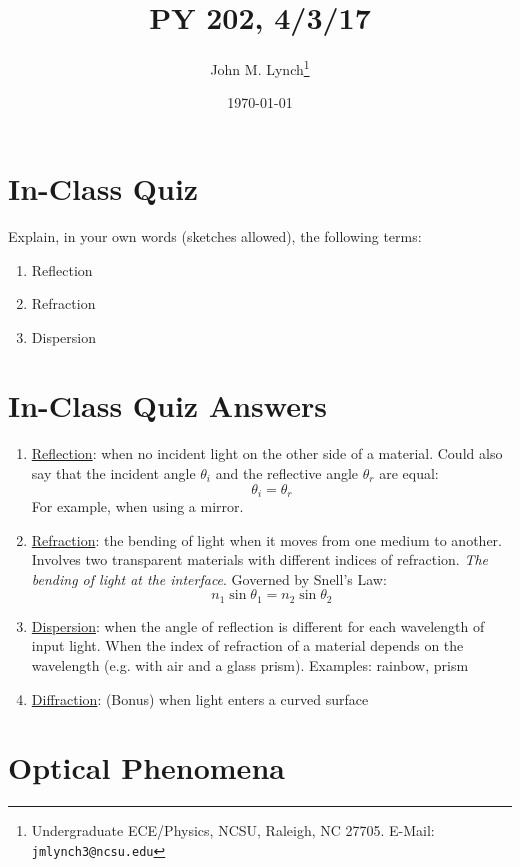 \documentclass[twocolumn,draft]{article}
\title{PY 202, 4/3/17}
\author{John M. Lynch\footnote{Undergraduate ECE/Physics, NCSU, Raleigh, NC 27705. E-Mail: \texttt{jmlynch3@ncsu.edu}}}
\date{\today}
\begin{document}
  \maketitle
\section*{In-Class Quiz}

Explain, in your own words (sketches allowed), the following terms:

\begin{enumerate}
	\item Reflection
	\item Refraction
	\item Dispersion
\end{enumerate}

\section*{In-Class Quiz Answers}

\begin{enumerate}
	\item \underline{Reflection}: when no incident light on the other side of a material. Could also
					  say that the incident angle $\theta_{i}$ and the reflective angle $\theta_{r}$
					  are equal:
					  \begin{equation}
					  	\theta_{i} = \theta_{r}
					  \end{equation}
					  For example, when using a mirror.
	\item \underline{Refraction}: the bending of light when it moves from one medium to another.
								  Involves two transparent materials with different indices
								  of refraction. \emph{The bending of light at the interface}.
								  Governed by Snell's Law:
								  \begin{equation}
								  	n_{1}\sin{\theta_{1}} = n_{2}\sin{\theta_{2}}
								  \end{equation}
	\item \underline{Dispersion}: when the angle of reflection is different for each wavelength
		 						  of input light. When the index of refraction of a material
								  depends on the wavelength (e.g. with air and a glass prism).
								  Examples: rainbow, prism
	\item \underline{Diffraction}: (Bonus) when light enters a curved surface
\end{enumerate}

\section*{Optical Phenomena}
\end{document}
